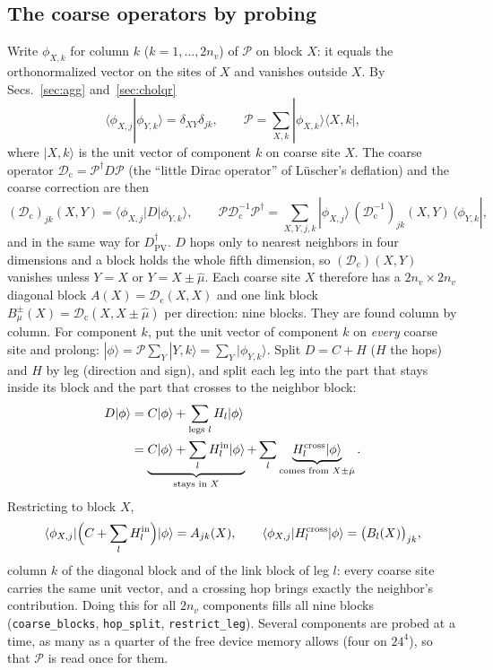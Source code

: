 \documentclass[11pt,a4paper]{article}
\numberwithin{equation}{section}
\newcommand{\dg}{^{\dagger}}
\newcommand{\Dpv}{D_{\mathrm{PV}}}
\newcommand{\Pro}{\mathcal P}
\newcommand{\Dc}{\mathcal D_{\mathrm c}}
\newcommand{\code}[1]{\texttt{\small #1}}
\begin{document}
\subsection{The coarse operators by probing}
\label{sec:probe}
Write $\phi_{X,k}$ for column $k$ ($k=1,\dots,2n_v$) of $\Pro$ on block $X$: it equals the
orthonormalized vector on the sites of $X$ and vanishes outside $X$. By
Secs.~\ref{sec:agg} and~\ref{sec:cholqr}
\begin{equation}
\langle\phi_{X,j}|\phi_{Y,k}\rangle=\delta_{XY}\delta_{jk},\qquad
\Pro=\sum_{X,k}|\phi_{X,k}\rangle\langle X,k| ,
\end{equation}
where $|X,k\rangle$ is the unit vector of component $k$ on coarse site $X$. The coarse operator
$\Dc=\Pro\dg D\Pro$ (the ``little Dirac operator'' of L\"uscher's deflation) and the coarse
correction are then
\begin{equation}
(\Dc)_{jk}(X,Y)=\langle\phi_{X,j}|D|\phi_{Y,k}\rangle,\qquad
\Pro\Dc^{-1}\Pro\dg=\sum_{X,Y,j,k}|\phi_{X,j}\rangle\,(\Dc^{-1})_{jk}(X,Y)\,\langle\phi_{Y,k}| ,
\end{equation}
and in the same way for $\Dpv\dg$. $D$ hops only to nearest neighbors in four dimensions and a
block holds the whole fifth dimension, so $(\Dc)(X,Y)$ vanishes unless $Y=X$ or $Y=X\pm\hat\mu$.
Each coarse site $X$ therefore has a $2n_v\times2n_v$ diagonal block $A(X)=\Dc(X,X)$ and one link
block $B_\mu^\pm(X)=\Dc(X,X\pm\hat\mu)$ per direction: nine blocks. They are found column by column. For component $k$,
put the unit vector of component $k$ on \emph{every} coarse site and prolong:
$|\phi\rangle=\Pro\sum_Y|Y,k\rangle=\sum_Y|\phi_{Y,k}\rangle$. Split $D=C+H$ ($H$ the hops) and $H$
by leg (direction and sign), and split each leg into the part that stays inside its block and the
part that crosses to the neighbor block:
\begin{align}
D|\phi\rangle&=C|\phi\rangle+\sum_{\text{legs }l}H_l|\phi\rangle\nonumber\\
&=\underbrace{C|\phi\rangle+\sum_lH_l^{\rm in}|\phi\rangle}_{\text{stays in }X}
+\sum_l\underbrace{H_l^{\rm cross}|\phi\rangle}_{\text{comes from }X\pm\hat\mu} .
\end{align}
Restricting to block $X$,
\begin{equation}
\langle\phi_{X,j}|\Big(C+\sum_lH^{\rm in}_l\Big)|\phi\rangle=A_{jk}(X),\qquad
\langle\phi_{X,j}|H^{\rm cross}_l|\phi\rangle=\big(B_l(X)\big)_{jk},
\end{equation}
column $k$ of the diagonal block and of the link block of leg $l$: every coarse site carries the
same unit vector, and a crossing hop brings exactly the neighbor's contribution. Doing this for all $2n_v$ components fills all nine blocks (\code{coarse\_blocks},
\code{hop\_split}, \code{restrict\_leg}). Several components are probed at a time, as many as a
quarter of the free device memory allows (four on $24^4$), so that $\Pro$ is read once for them.
\end{document}
